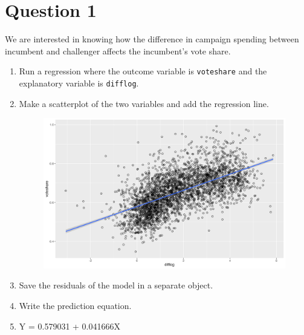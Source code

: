 \documentclass[12pt,letterpaper]{article}
\begin{document}
\section*{Question 1}
\vspace{.25cm}
\noindent We are interested in knowing how the difference in campaign spending between incumbent and challenger affects the incumbent's vote share. 
	\begin{enumerate}
		\item Run a regression where the outcome variable is \texttt{voteshare} and the explanatory variable is \texttt{difflog}.	
		
		\vspace{5cm}
		\item Make a scatterplot of the two variables and add the regression line. 
			\begin{figure}
			\includegraphics[width=0.75\linewidth]{sc_plot1.png}
			\label{Fig1}
		\end{figure}
		\vspace{1cm}
		\item Save the residuals of the model in a separate object.	
		
		\vspace{1cm}
		\item Write the prediction equation.
		\item[] Y = 0.579031 + 0.041666X
	\end{enumerate}
	
\newpage
\end{document}
